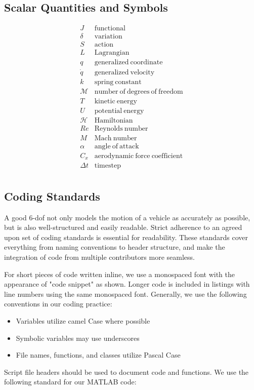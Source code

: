 \documentclass[10pt, openany, titlepage]{book}
\theoremstyle{definition}
\begin{document}
\subsection*{Scalar Quantities and Symbols}
$$\begin{array}{ll}
     J&  \mathrm{functional}\\
     \delta&\mathrm{variation}\\
      S& \mathrm{action}\\
      L & \mathrm{Lagrangian}\\
              q& \mathrm{generalized \ coordinate}\\
         \dot{q}& \mathrm{generalized \ velocity}\\
       k& \mathrm{spring \ constant}\\
        \mathcal{M}& \mathrm{number\ of\ degrees\ of\ freedom}\\
     T& \mathrm{kinetic \ energy}\\
      U& \mathrm{potential \ energy}\\
    \mathcal{H}& \mathrm{Hamiltonian}\\
     Re& \mathrm{Reynolds\ number}\\
     M & \mathrm{Mach \ number}\\
      \alpha & \mathrm{angle \ of \ attack}\\
       C_x& \mathrm{aerodynamic \ force \ coefficient}\\
        \Delta t& \mathrm{timestep}\\
\end{array}$$
\subsection*{Coding Standards}
A good 6-\gls{dof} not only models the motion of a vehicle as accurately as possible, but is also well-structured and easily readable. Strict adherence to an agreed upon set of coding standards is essential for readability. These standards cover everything from naming conventions to header structure, and make the integration of code from multiple contributors more seamless.

For short pieces of code written inline, we use a monospaced font with the appearance of "code snippet" as shown. Longer code is included in listings with line numbers using the same monospaced font. Generally, we use the following conventions in our coding practice:
\begin{itemize}
    \item Variables utilize camel Case where possible
    \item Symbolic variables may use underscores
    \item File names, functions, and classes utilize Pascal Case


\end{itemize}
Script file headers should be used to document code and functions. We use the following standard for our MATLAB code:
\end{document}
